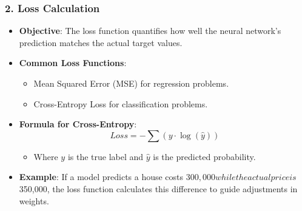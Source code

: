 \documentclass[aspectratio=169]{beamer}
\begin{document}
\begin{frame}[fragile]
    \frametitle{2. Loss Calculation}

    \begin{itemize}
        \item \textbf{Objective}: The loss function quantifies how well the neural network's prediction matches the actual target values.
        
        \item \textbf{Common Loss Functions}:
        \begin{itemize}
            \item Mean Squared Error (MSE) for regression problems.
            \item Cross-Entropy Loss for classification problems.
        \end{itemize}
        
        \item \textbf{Formula for Cross-Entropy}:
        \begin{equation}
        Loss = -\sum (y \cdot \log(\hat{y}))
        \end{equation}
        \begin{itemize}
            \item Where \( y \) is the true label and \( \hat{y} \) is the predicted probability.
        \end{itemize}
        
        \item \textbf{Example}: If a model predicts a house costs $300,000 while the actual price is $350,000, the loss function calculates this difference to guide adjustments in weights.
    \end{itemize}
\end{frame}
\end{document}
